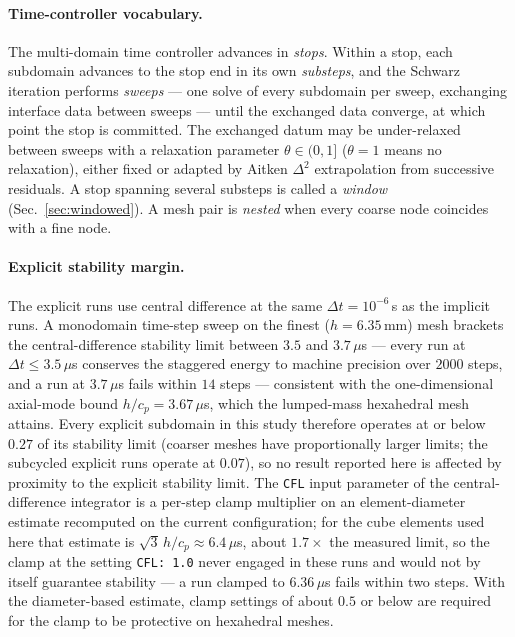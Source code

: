 \documentclass[11pt]{article}
\newcommand{\code}[1]{\texttt{#1}}
\begin{document}
\paragraph{Time-controller vocabulary.} The multi-domain time controller
advances in \emph{stops}. Within a stop, each subdomain advances to the
stop end in its own \emph{substeps}, and the Schwarz iteration performs
\emph{sweeps} --- one solve of every subdomain per sweep, exchanging
interface data between sweeps --- until the exchanged data converge, at
which point the stop is committed. The exchanged datum may be
under-relaxed between sweeps with a relaxation parameter
$\theta \in (0, 1]$ ($\theta = 1$ means no relaxation), either fixed or
adapted by Aitken $\Delta^2$ extrapolation from successive residuals. A
stop spanning several substeps is called a \emph{window}
(Sec.~\ref{sec:windowed}). A mesh pair is \emph{nested} when every coarse
node coincides with a fine node.

\paragraph{Explicit stability margin.} The explicit runs use central
difference at the same $\Delta t = 10^{-6}$\,s as the implicit runs. A
monodomain time-step sweep on the finest ($h = 6.35$\,mm) mesh brackets
the central-difference stability limit between $3.5$ and $3.7\,\mu$s ---
every run at $\Delta t \le 3.5\,\mu$s conserves the staggered energy to
machine precision over $2000$ steps, and a run at $3.7\,\mu$s fails within
$14$ steps --- consistent with the one-dimensional axial-mode bound
$h/c_p = 3.67\,\mu$s, which the lumped-mass hexahedral mesh attains.
Every explicit subdomain in this study therefore operates at or below
$0.27$ of its stability limit (coarser meshes have proportionally larger
limits; the subcycled explicit runs operate at $0.07$), so no result
reported here is affected by proximity to the explicit stability limit.
The \code{CFL} input parameter of the central-difference integrator is a
per-step clamp multiplier on an element-diameter estimate recomputed on
the current configuration; for the cube elements used here that estimate
is $\sqrt{3}\,h/c_p \approx 6.4\,\mu$s, about $1.7\times$ the measured
limit, so the clamp at the setting \code{CFL: 1.0} never engaged in these
runs and would not by itself guarantee stability --- a run clamped to
$6.36\,\mu$s fails within two steps. With the diameter-based estimate,
clamp settings of about $0.5$ or below are required for the clamp to be
protective on hexahedral meshes.
\end{document}
